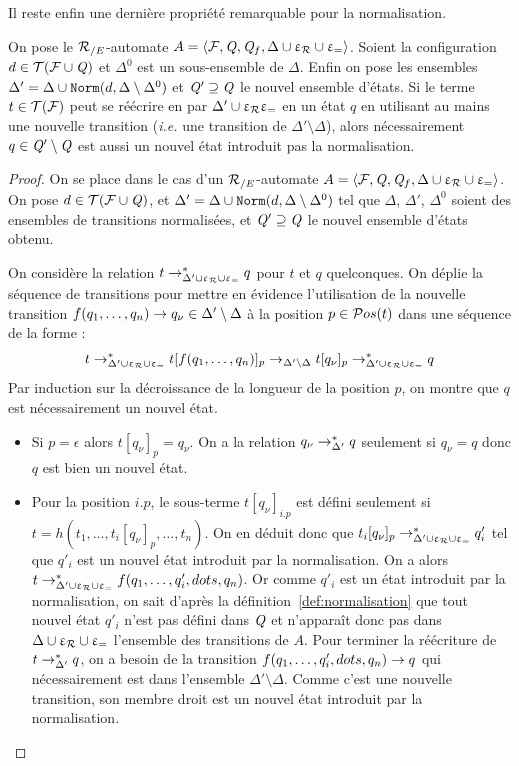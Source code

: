 Il reste enfin une dernière propriété remarquable pour la normalisation. 
\begin{property}
  \label{prop:norm_transitions}
  On pose le ${\mathcal R_{/E}}$-automate $A = \langle \mathcal{F}, \mathit Q, \mathit Q_f, \Delta \cup \upvarepsilon_{\mathcal R} \cup \upvarepsilon_{=}\rangle$.
  Soient la configuration $d \in \mathcal{ T(F \cup \mathit Q)}$ et $\Delta^0$ est un sous-ensemble de $\Delta$.
  Enfin on pose les ensembles $\Delta'= \Delta \cup \mathtt{Norm}(d, \Delta\setminus\Delta^0)$ et $\mathit Q'\supseteq\mathit Q$ le nouvel ensemble d'états.
  Si le terme $t \in \mathcal{T(F)}$ peut se réécrire en par $\Delta'\cup\upvarepsilon_{\mathcal R}\upvarepsilon_{=}$ en un état $q$ en utilisant au mains une nouvelle transition (\textit{i.e.} une transition de $\Delta' \setminus \Delta$),
  alors nécessairement $q \in \mathit Q'\setminus\mathit Q$ est aussi un nouvel état introduit pas la normalisation.
\end{property}

\begin{proof}
  On se place dans le cas d'un ${\mathcal R_{/E}}$-automate $A = \langle \mathcal{F}, \mathit Q, \mathit Q_f, \Delta \cup \upvarepsilon_{\mathcal R} \cup \upvarepsilon_{=}\rangle$.
  On pose $d \in \mathcal{ T(F \cup \mathit Q)}$, et $\Delta'= \Delta \cup \mathtt{Norm}(d, \Delta\setminus\Delta^0)$ tel que $\Delta$, $\Delta'$, $\Delta^0$ soient 
  des ensembles de transitions normalisées, et $\mathit Q'\supseteq \mathit Q$ le nouvel ensemble d'états obtenu.
  
  On considère la relation $t \rightarrow^*_{\Delta'\cup\upvarepsilon_{\mathcal R}\cup\upvarepsilon_{=}} q$ pour $t$ et $q$ quelconques.
  On déplie la séquence de transitions pour mettre en évidence l'utilisation 
  de la nouvelle transition $f(q_1,\dots,q_n) \rightarrow q_\nu \in \Delta'\setminus\Delta$
  à la position $p \in \mathcal{ P}os(t)$ dans une séquence de la forme :
  \[t \rightarrow^*_{\Delta'\cup\upvarepsilon_{\mathcal R}\cup\upvarepsilon_{=}} t[f(q_1,\dots,q_n)]_p \rightarrow_{\Delta'\setminus\Delta} t[q_\nu]_p \rightarrow^*_{\Delta'\cup\upvarepsilon_{\mathcal R}\cup\upvarepsilon_{=}} q\]
  Par induction sur la décroissance de la longueur de la position $p$, on montre que $q$ est nécessairement un nouvel état.
  \begin{itemize}
  \item Si $p = \epsilon$ alors $t[q_\nu]_p = q_\nu$. On a la relation $q_\nu \rightarrow^*_{\Delta'} q$
    seulement si $q_\nu = q$ donc $q$ est bien un nouvel état. 
    
  \item Pour la position $i.p$, le sous-terme $t[q_\nu]_{i.p}$ est défini seulement si 
    $t = h(t_1,\dots, t_i[q_\nu]_p, \dots,t_n)$. On en déduit donc que $t_i[q_\nu]_p \rightarrow^*_{\Delta'\cup\upvarepsilon_{\mathcal R}\cup\upvarepsilon_{=}} q'_i$
    tel que $q'_i$ est un nouvel état introduit par la normalisation.
    On a alors $t \rightarrow^*_{\Delta'\cup\upvarepsilon_{\mathcal R}\cup\upvarepsilon_{=}} f(q_1,\dots,q'_i,dots,q_n)$. Or comme $q'_i$ est un 
    état introduit par la normalisation, on sait d'après la définition~\ref{def:normalisation}
    que tout nouvel état $q'_i$ n'est pas défini dans $\mathit Q$ et n'apparaît donc pas dans $\Delta \cup \upvarepsilon_{\mathcal R} \cup \upvarepsilon_{=}$ l'ensemble des transitions de $A$.
    Pour terminer la réécriture de $t \rightarrow_{\Delta'}^* q$, on a besoin de la transition
    $f(q_1,\dots,q'_i,dots,q_n) \rightarrow q$ qui nécessairement est dans l'ensemble $\Delta'\setminus\Delta$.
    Comme c'est une nouvelle transition, son membre droit est un nouvel état introduit par la normalisation.
  \end{itemize}
\end{proof}


